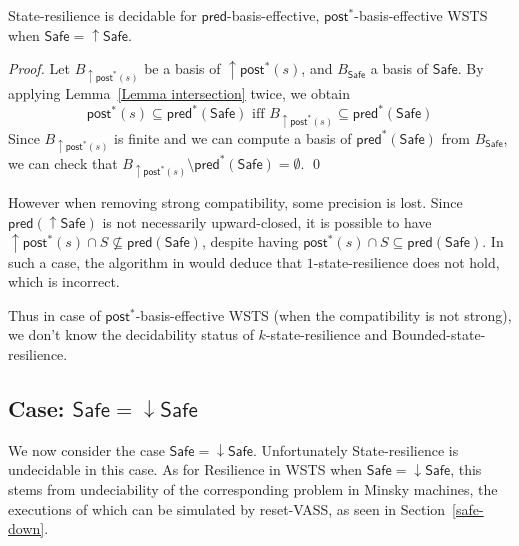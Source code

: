 \documentclass[runningheads]{llncs}
\newcommand{\alain}[1]{\todo[inline,color=red!20]{{\bf AF:} #1}}
\newcommand{\pred}{\textsf{pred}}
\newcommand{\post}{\textsf{post}}
\newcommand{\Safe}{\textsf{Safe}}
\begin{document}
\begin{theorem}\label{post srp}
{\sc State-resilience} is decidable for $\pred$-basis-effective, $\post^*$-basis-effective WSTS
when
$\Safe=\mathop{\uparrow} \Safe$. 
\end{theorem}


\begin{proof}
Let $B_{\mathop{\uparrow} \post^*(s)}$ 
 be a basis of $\mathop{\uparrow} \post^*(s)$, and $B_\Safe$ a basis of $\Safe$.
By applying Lemma~\ref{Lemma intersection} twice, we obtain
\[ \post^*(s) 
 \subseteq \pred^*(\Safe) \text{ iff } B_{\mathop{\uparrow} \post^*(s)}  
 \subseteq \pred^*(\Safe)\]
Since $B_{\mathop{\uparrow} \post^*(s)}$ is finite and we can compute 
a basis of $\pred^*(\Safe)$ from $B_\Safe$, we can check that $B_{\mathop{\uparrow} \post^*(s)} 
 \setminus \pred^*(\Safe) = \emptyset$.  \qed
\end{proof}





However when removing strong compatibility, some precision is lost.
Since $\pred(\mathop{\uparrow} \Safe)$ is not necessarily upward-closed, it is possible to have 
 $\mathop{\uparrow} \post^* (s) \cap S \not\subseteq \pred(\Safe)$,
despite having 
$\post^* (s) \cap S \subseteq \pred( \Safe)$.
In such a case, the algorithm in
\cite{DBLP:conf/gg/Ozkan22} would deduce that {\sc $1$-state-resilience} does not hold,
which is incorrect.

Thus in case of $\post^*$-basis-effective WSTS (when the compatibility is not strong), we don't know the decidability status of {\sc $k$-state-resilience} and 
{\sc Bounded-state-resilience}. 





\subsection{Case: $\Safe = \mathop{\downarrow} \Safe$}


We now consider the case $\Safe = \mathop{\downarrow} \Safe$.
%
Unfortunately {\sc State-resilience} is undecidable in this case. As for {\sc Resilience} in WSTS when $\Safe = \mathop{\downarrow} \Safe$, this stems from undeciability of the corresponding problem in Minsky machines, the executions of which can be simulated by reset-VASS, as seen in 
Section~\ref{safe-down}.\alain{trop rapide}
\end{document}
